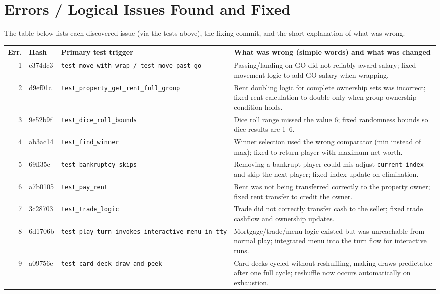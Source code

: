 \documentclass[11pt,a4paper]{article}
\begin{document}
\section{Errors / Logical Issues Found and Fixed}
\label{sec:errors}
The table below lists each discovered issue (via the tests above), the fixing commit, and the short explanation of what was wrong.

\begin{longtable}{@{}r p{} p{} p{}@{}}
\toprule
\textbf{Err.} & \textbf{Hash} & \textbf{Primary test trigger} & \textbf{What was wrong (simple words) and what was changed} \\
\midrule
\endhead
1 & c374dc3 & \nolinkurl{test_move_with_wrap / test_move_past_go} & Passing/landing on GO did not reliably award salary; fixed movement logic to add GO salary when wrapping. \\
2 & d9ef01c & \nolinkurl{test_property_get_rent_full_group} & Rent doubling logic for complete ownership sets was incorrect; fixed rent calculation to double only when group ownership condition holds. \\
3 & 9e52b9f & \nolinkurl{test_dice_roll_bounds} & Dice roll range missed the value 6; fixed randomness bounds so dice results are 1--6. \\
4 & ab3ac14 & \nolinkurl{test_find_winner} & Winner selection used the wrong comparator (min instead of max); fixed to return player with maximum net worth. \\
5 & 69ff35c & \nolinkurl{test_bankruptcy_skips} & Removing a bankrupt player could mis-adjust \texttt{current\_index} and skip the next player; fixed index update on elimination. \\
6 & a7b0105 & \nolinkurl{test_pay_rent} & Rent was not being transferred correctly to the property owner; fixed rent transfer to credit the owner. \\
7 & 3c28703 & \nolinkurl{test_trade_logic} & Trade did not correctly transfer cash to the seller; fixed trade cashflow and ownership updates. \\
8 & 6d1706b & \nolinkurl{test_play_turn_invokes_interactive_menu_in_tty} & Mortgage/trade/menu logic existed but was unreachable from normal play; integrated menu into the turn flow for interactive runs. \\
9 & a09756e & \nolinkurl{test_card_deck_draw_and_peek} & Card decks cycled without reshuffling, making draws predictable after one full cycle; reshuffle now occurs automatically on exhaustion. \\
\bottomrule
\end{longtable}
\end{document}
